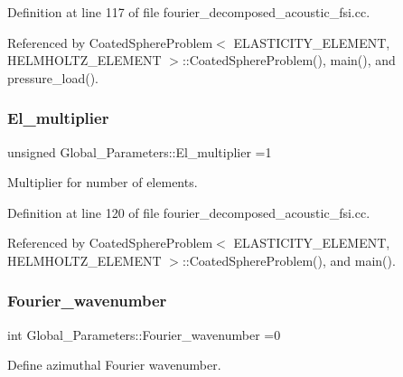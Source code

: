 Definition at line 117 of file fourier\+\_\+decomposed\+\_\+acoustic\+\_\+fsi.\+cc.



Referenced by Coated\+Sphere\+Problem$<$ E\+L\+A\+S\+T\+I\+C\+I\+T\+Y\+\_\+\+E\+L\+E\+M\+E\+N\+T, H\+E\+L\+M\+H\+O\+L\+T\+Z\+\_\+\+E\+L\+E\+M\+E\+N\+T $>$\+::\+Coated\+Sphere\+Problem(), main(), and pressure\+\_\+load().

\mbox{\label{namespaceGlobal__Parameters_a35d5d2ecfff0cec6150a5dc79e5c1ad1}} 
\subsubsection{\texorpdfstring{El\+\_\+multiplier}{El\_multiplier}}
{\footnotesize\ttfamily unsigned Global\+\_\+\+Parameters\+::\+El\+\_\+multiplier =1}



Multiplier for number of elements. 



Definition at line 120 of file fourier\+\_\+decomposed\+\_\+acoustic\+\_\+fsi.\+cc.



Referenced by Coated\+Sphere\+Problem$<$ E\+L\+A\+S\+T\+I\+C\+I\+T\+Y\+\_\+\+E\+L\+E\+M\+E\+N\+T, H\+E\+L\+M\+H\+O\+L\+T\+Z\+\_\+\+E\+L\+E\+M\+E\+N\+T $>$\+::\+Coated\+Sphere\+Problem(), and main().

\mbox{\label{namespaceGlobal__Parameters_ae1198385d90f52c4ed921520ae43a9e7}} 
\subsubsection{\texorpdfstring{Fourier\+\_\+wavenumber}{Fourier\_wavenumber}}
{\footnotesize\ttfamily int Global\+\_\+\+Parameters\+::\+Fourier\+\_\+wavenumber =0}



Define azimuthal Fourier wavenumber. 



